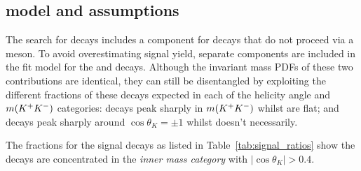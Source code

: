 \subsection{\decay{\Bp}{\Dsp \Kp \Km} model and assumptions}
\label{sec:B2DsPhi_B2DsKKModel}
The search for \decay{\Bp}{\Dsp\phiz} decays includes a component for \decay{\Bp}{\Dsp\Kp\Km} decays that do not proceed via a \phiz meson. To avoid overestimating \decay{\Bp}{\Dsp\phiz} signal yield, separate components are included in the fit model for the \decay{\Bp}{\Dsp\phiz} and \decay{\Bp}{\Dsp\Kp\Km} decays. Although the invariant mass PDFs of these two contributions are identical, they can still be disentangled by exploiting the different fractions of these decays expected in each of the helicity angle and $m({{K}^+}{{K}^-})$ categories: \decay{\Bp}{\Dsp\phiz} decays peak sharply in $m({{K}^+}{{K}^-})$ whilst \decay{\Bp}{\Dsp\Kp\Km} are flat; and \decay{\Bp}{\Dsp\phiz} decays peak sharply around $\cos{\theta_{K}} = \pm 1$ whilst \decay{\Bp}{\Dsp\Kp\Km} doesn't necessarily. 


The fractions for the \decay{\Bp}{\Dsp\phiz} signal decays as listed in Table~\ref{tab:signal_ratios} show the decays are concentrated in the \emph{inner \phiz mass category} with $|\cos{\theta_{K}} |> 0.4$. 




